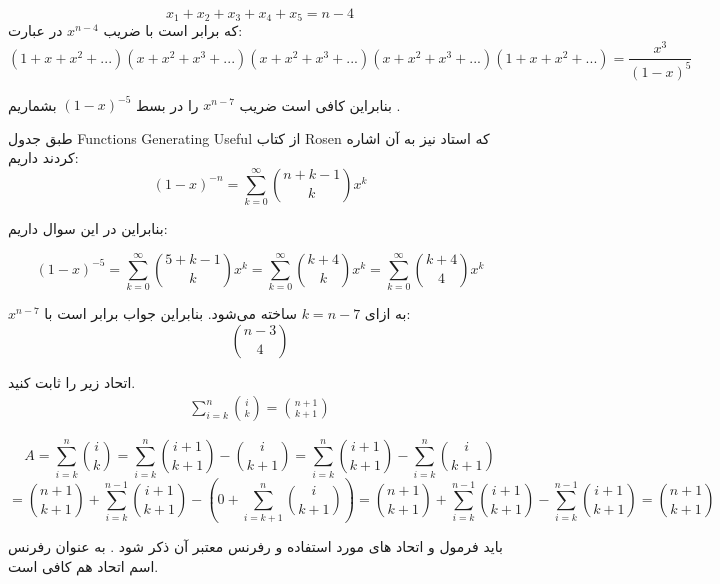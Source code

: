 \documentclass[11pt,largemargins]{h2wp}
\begin{document}
                $$x_1 + x_2 + x_3 + x_4 + x_5 = n - 4$$
                که برابر است با ضریب
                $x^{n - 4}$
                در عبارت:\\
              
                $$(1 + x + x^2 + ...)(x + x^2 + x^3 + ...)(x + x^2 + x^3 + ...)(x + x^2 + x^3 + ...)(1 + x + x^2 + ...) = \frac{x^3}{(1 - x)^5}$$
                
                 بنابراین کافی است ضریب $x^{n - 7}$ را در بسط
                  $(1 - x)^{-5}$
         بشماریم . 
               
               
                   طبق جدول  
                  Functions Generating Useful
		از کتاب Rosen
		که استاد نیز به آن اشاره کردند داریم:\\
       
		    $$(1 - x) ^ {-n} = \sum_{k = 0}^{\infty} \binom{n + k - 1}{k} x^{k} $$

	    بنابراین در این سوال داریم:
                
                    $$(1 - x)^{-5} = \sum_{k = 0}^{\infty} \binom{5 + k - 1}{k}x^k
                    = \sum_{k = 0}^{\infty} \binom{k + 4}{k}x^k
                    = \sum_{k = 0}^{\infty} \binom{k + 4}{4}x^k$$
             
                $x^{n - 7}$ به ازای $k = n -7$ ساخته می‌شود. بنابراین جواب برابر است با:\\
               
                    $$\binom{n - 3}{4}$$
        

\question

 اتحاد زیر را ثابت کنید.
     \begin{align*}
     \sum_{i=k}^{n} {\binom{i}{k}} = \binom{n+1}{k+1}
     \end{align*}
     
\solution

\[A=\sum_{i=k}^{n} {\binom{i}{k}} =\sum_{i=k}^{n} {\binom{i+1}{k+1}-\binom{i}{k+1}}=\sum_{i=k}^{n} {\binom{i+1}{k+1}}-\sum_{i=k}^{n} {\binom{i}{k+1}}\]\[=\binom{n+1}{k+1}+\sum_{i=k}^{n-1} {\binom{i+1}{k+1}}-(0+\sum_{i=k+1}^{n} {\binom{i}{k+1}})=\binom{n+1}{k+1}+\sum_{i=k}^{n-1} {\binom{i+1}{k+1}}-\sum_{i=k}^{n-1} {\binom{i+1}{k+1}}=\binom{n+1}{k+1}\]



\notes

  باید فرمول و اتحاد های مورد استفاده و رفرنس معتبر آن ‌ذکر شود . به عنوان رفرنس اسم اتحاد هم کافی است. 
       	 
\end{document}
